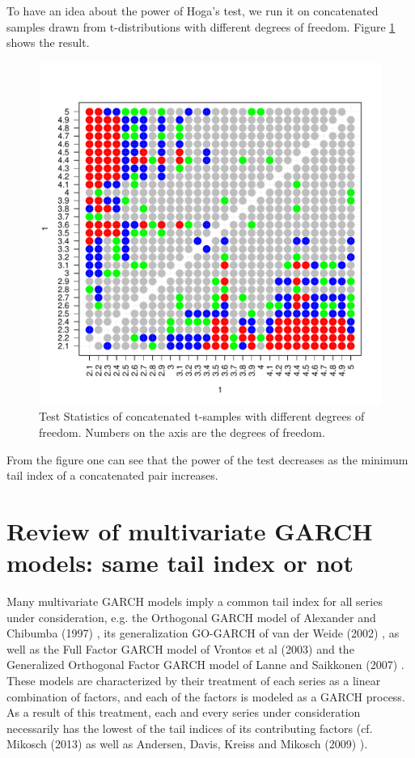 \documentclass{article}
\begin{document}
To have an idea about the power of Hoga's test, we run it on
concatenated samples drawn from t-distributions with different degrees
of freedom. Figure \ref{fig:t_sim_pair} shows the result.
\begin{figure}[htb!]
  \centering
  \includegraphics[width=\textwidth]{t_sim_pair.pdf}
  \caption{Test Statistics of concatenated t-samples with different
    degrees of freedom. Numbers on the axis are the degrees of freedom.}
  \label{fig:t_sim_pair}
\end{figure}
From the figure one can see that the power of the test decreases as
the minimum tail index of a concatenated pair increases.

\section{Review of multivariate GARCH models:
  same tail index or not}
Many multivariate GARCH models imply a common tail index for all
series under consideration, e.g. the Orthogonal GARCH model of
Alexander and Chibumba (1997) \cite{alexander1997multivariate}, its
generalization GO-GARCH of van der Weide (2002) \cite{van2002go}, as
well as the Full Factor GARCH model of Vrontos et al (2003)
\cite{vrontos2003full} and the Generalized Orthogonal Factor GARCH
model of Lanne and Saikkonen (2007) \cite{lanne2007modeling}. These
models are characterized by their treatment of each series as a linear
combination of factors, and each of the factors is modeled as a GARCH
process. As a result of this treatment, each and every series under
consideration necessarily has the lowest of the tail indices of its
contributing factors (cf. Mikosch (2013) \cite{Mikosch2013} as well
as Andersen, Davis, Kreiss and Mikosch (2009)
\cite{andersen2009handbook}).
\end{document}
